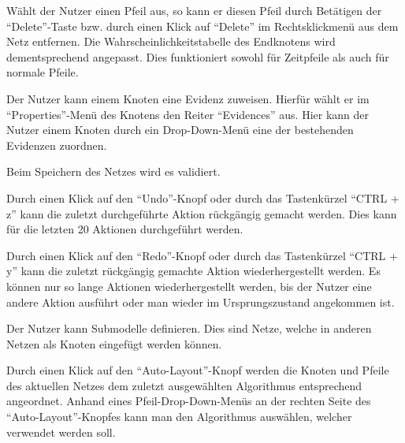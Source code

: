 \documentclass[parskip=full,11pt,twoside]{scrartcl}
\begin{document}
Wählt der Nutzer einen Pfeil aus, so kann er diesen Pfeil durch Betätigen der \enquote{Delete}-Taste bzw. durch einen Klick auf \enquote{Delete} im Rechtsklickmenü aus dem Netz entfernen. Die Wahrscheinlichkeitstabelle des Endknotens wird dementsprechend angepasst. Dies funktioniert sowohl für Zeitpfeile als auch für normale Pfeile.

Der Nutzer kann einem Knoten eine Evidenz zuweisen. Hierfür wählt er im \enquote{Properties}-Menü des Knotens den Reiter \enquote{Evidences} aus. Hier kann der Nutzer einem Knoten durch ein Drop-Down-Menü eine der bestehenden Evidenzen zuordnen. %

Beim Speichern des Netzes wird es validiert.

Durch einen Klick auf den \enquote{Undo}-Knopf oder durch das Tastenkürzel \enquote{CTRL + z} kann die zuletzt durchgeführte Aktion rückgängig gemacht werden. Dies kann für die letzten 20 Aktionen durchgeführt werden.

Durch einen Klick auf den \enquote{Redo}-Knopf oder durch das Tastenkürzel \enquote{CTRL + y} kann die zuletzt rückgängig gemachte Aktion wiederhergestellt werden. Es können nur so lange Aktionen wiederhergestellt werden, bis der Nutzer eine andere Aktion ausführt oder man wieder im Ursprungszustand angekommen ist.

Der Nutzer kann Submodelle definieren. Dies sind Netze, welche in anderen Netzen als Knoten eingefügt werden können.

Durch einen Klick auf den \enquote{Auto-Layout}-Knopf werden die Knoten und Pfeile des aktuellen Netzes dem zuletzt ausgewählten Algorithmus entsprechend angeordnet. Anhand eines Pfeil-Drop-Down-Menüs an der rechten Seite des \enquote{Auto-Layout}-Knopfes kann man den Algorithmus auswählen, welcher verwendet werden soll.
\end{document}
